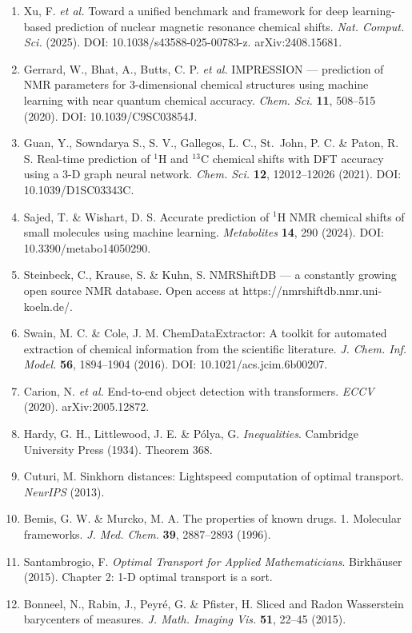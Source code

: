 \documentclass[
]{article}
\providecommand{\tightlist}{%
  \setlength{\itemsep}{0pt}\setlength{\parskip}{0pt}}
\begin{document}
\begin{enumerate}
\def\labelenumi{\arabic{enumi}.}
\tightlist
\item
  Xu, F. \emph{et al.} Toward a unified benchmark and framework for deep
  learning-based prediction of nuclear magnetic resonance chemical
  shifts. \emph{Nat. Comput. Sci.} (2025). DOI:
  10.1038/s43588-025-00783-z. arXiv:2408.15681.
\item
  Gerrard, W., Bhat, A., Butts, C. P. \emph{et al.} IMPRESSION ---
  prediction of NMR parameters for 3-dimensional chemical structures
  using machine learning with near quantum chemical accuracy.
  \emph{Chem. Sci.} \textbf{11}, 508--515 (2020). DOI:
  10.1039/C9SC03854J.
\item
  Guan, Y., Sowndarya S., S. V., Gallegos, L. C., St.~John, P. C. \&
  Paton, R. S. Real-time prediction of \(^1\)H and \(^{13}\)C chemical
  shifts with DFT accuracy using a 3-D graph neural network. \emph{Chem.
  Sci.} \textbf{12}, 12012--12026 (2021). DOI: 10.1039/D1SC03343C.
\item
  Sajed, T. \& Wishart, D. S. Accurate prediction of \(^1\)H NMR
  chemical shifts of small molecules using machine learning.
  \emph{Metabolites} \textbf{14}, 290 (2024). DOI:
  10.3390/metabo14050290.
\item
  Steinbeck, C., Krause, S. \& Kuhn, S. NMRShiftDB --- a constantly
  growing open source NMR database. Open access at
  https://nmrshiftdb.nmr.uni-koeln.de/.
\item
  Swain, M. C. \& Cole, J. M. ChemDataExtractor: A toolkit for automated
  extraction of chemical information from the scientific literature.
  \emph{J. Chem. Inf. Model.} \textbf{56}, 1894--1904 (2016). DOI:
  10.1021/acs.jcim.6b00207.
\item
  Carion, N. \emph{et al.} End-to-end object detection with
  transformers. \emph{ECCV} (2020). arXiv:2005.12872.
\item
  Hardy, G. H., Littlewood, J. E. \& Pólya, G. \emph{Inequalities}.
  Cambridge University Press (1934). Theorem 368.
\item
  Cuturi, M. Sinkhorn distances: Lightspeed computation of optimal
  transport. \emph{NeurIPS} (2013).
\item
  Bemis, G. W. \& Murcko, M. A. The properties of known drugs. 1.
  Molecular frameworks. \emph{J. Med. Chem.} \textbf{39}, 2887--2893
  (1996).
\item
  Santambrogio, F. \emph{Optimal Transport for Applied Mathematicians}.
  Birkhäuser (2015). Chapter 2: 1-D optimal transport is a sort.
\item
  Bonneel, N., Rabin, J., Peyré, G. \& Pfister, H. Sliced and Radon
  Wasserstein barycenters of measures. \emph{J. Math. Imaging Vis.}
  \textbf{51}, 22--45 (2015).
\end{enumerate}
\end{document}

